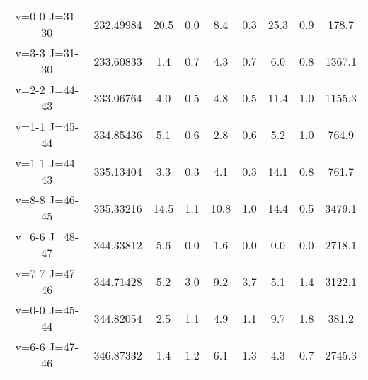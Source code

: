 \begin{table*}[htp]
\begin{tabular}{ccccccccc}
v=0-0 J=31-30 & 232.49984 & 20.5 & 0.0 & 8.4 & 0.3 & 25.3 & 0.9 & 178.7 \\
v=3-3 J=31-30 & 233.60833 & 1.4 & 0.7 & 4.3 & 0.7 & 6.0 & 0.8 & 1367.1 \\
v=2-2 J=44-43 & 333.06764 & 4.0 & 0.5 & 4.8 & 0.5 & 11.4 & 1.0 & 1155.3 \\
v=1-1 J=45-44 & 334.85436 & 5.1 & 0.6 & 2.8 & 0.6 & 5.2 & 1.0 & 764.9 \\
v=1-1 J=44-43 & 335.13404 & 3.3 & 0.3 & 4.1 & 0.3 & 14.1 & 0.8 & 761.7 \\
v=8-8 J=46-45 & 335.33216 & 14.5 & 1.1 & 10.8 & 1.0 & 14.4 & 0.5 & 3479.1 \\
v=6-6 J=48-47 & 344.33812 & 5.6 & 0.0 & 1.6 & 0.0 & 0.0 & 0.0 & 2718.1 \\
v=7-7 J=47-46 & 344.71428 & 5.2 & 3.0 & 9.2 & 3.7 & 5.1 & 1.4 & 3122.1 \\
v=0-0 J=45-44 & 344.82054 & 2.5 & 1.1 & 4.9 & 1.1 & 9.7 & 1.8 & 381.2 \\
v=6-6 J=47-46 & 346.87332 & 1.4 & 1.2 & 6.1 & 1.3 & 4.3 & 0.7 & 2745.3 \\
\hline
\end{tabular}

\par 
\end{table*}
